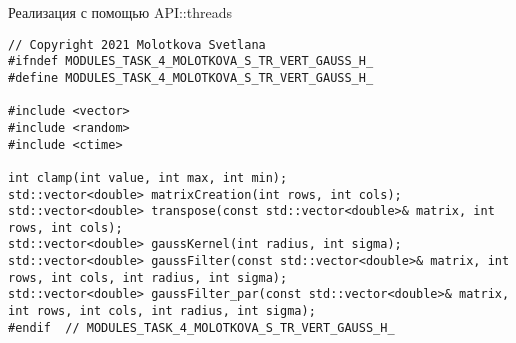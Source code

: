 \documentclass{report}
\begin{document}
Реализация с помощью API::threads
\begin{lstlisting}
// Copyright 2021 Molotkova Svetlana
#ifndef MODULES_TASK_4_MOLOTKOVA_S_TR_VERT_GAUSS_H_
#define MODULES_TASK_4_MOLOTKOVA_S_TR_VERT_GAUSS_H_

#include <vector>
#include <random>
#include <ctime>

int clamp(int value, int max, int min);
std::vector<double> matrixCreation(int rows, int cols);
std::vector<double> transpose(const std::vector<double>& matrix, int rows, int cols);
std::vector<double> gaussKernel(int radius, int sigma);
std::vector<double> gaussFilter(const std::vector<double>& matrix, int rows, int cols, int radius, int sigma);
std::vector<double> gaussFilter_par(const std::vector<double>& matrix, int rows, int cols, int radius, int sigma);
#endif  // MODULES_TASK_4_MOLOTKOVA_S_TR_VERT_GAUSS_H_
\end{lstlisting}
\end{document}
